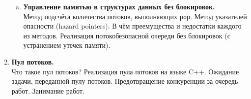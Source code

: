 \documentclass{article}
\begin{document}
\begin{enumerate}
\begin{enumerate}[a.]
\item \textbf{Управление памятью в структурах данных без блокировок.}\\
Метод подсчёта количества потоков, выполняющих \texttt{pop}. Метод указателей опасности (hazard pointers). В чём преемущества и недостатки каждого из методов. Реализация потокобезопасной очереди без блокировок (с устранением утечек памяти). 
\end{enumerate}



\item \textbf{Пул потоков.}\\
Что такое пул потоков? Реализация пула потоков на языке C++.
Ожидание задачи, переданной пулу потоков.
Предотвращение конкуренции за очередь работ. Занимание работ.



\end{enumerate}
\end{document}
